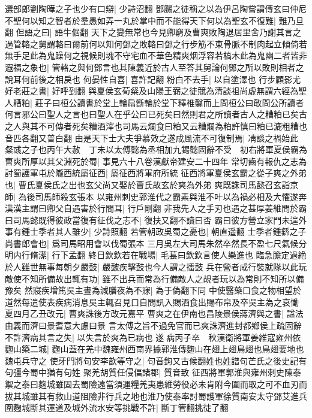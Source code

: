 選部郎劉陶曄之子也少有口辯|{
	少詩沼翻}
鄧颺之徒稱之以為伊呂陶嘗謂傳玄曰仲尼不聖何以知之智者於羣愚如弄一丸於掌中而不能得天下何以為聖玄不復難|{
	難乃旦翻}
但語之曰|{
	語牛倨翻}
天下之變無常也今見卿窮及曹爽敗陶退居里舍乃謝其言之過管輅之舅謂輅曰爾前何以知何鄧之敗輅曰鄧之行步筋不束骨脈不制肉起立傾倚若無手足此為鬼躁何之視候則魂不守宅血不華色精爽烟浮容若槁木此為鬼幽二者皆非遐福之象也|{
	管輅之與何鄧言也其陳義近於古人至答其舅論何鄧之所以敗則相者之說耳何前後之相戾也}
何晏性自喜|{
	喜許記翻}
粉白不去手|{
	以自塗澤也}
行步顧影尤好老莊之書|{
	好呼到翻}
與夏侯玄荀粲及山陽王弼之徒競為清談祖尚虚無謂六經為聖人糟粕|{
	莊子曰桓公讀書於堂上輪扁斵輪於堂下釋椎鑿而上問桓公曰敢問公所讀者何言邪公曰聖人之言也曰聖人在乎公曰已死矣曰然則君之所讀者古人之糟粕已矣古之人與其不可傳者死矣糟酒滓也司馬云爛食曰粕又云糟爛為粕許慎曰粕已漉粗糟也音匹各翻又普白翻}
由是天下士大夫爭慕效之遂成風流不可復制焉|{
	凊談之禍始此}
粲彧之子也丙午大赦　丁未以太傅懿為丞相加九錫懿固辭不受　初右將軍夏侯霸為曹爽所厚以其父淵死於蜀|{
	事見六十八卷漢獻帝建安二十四年}
常切齒有報仇之志為討蜀護軍屯於隴西統屬征西|{
	屬征西將軍府所統}
征西將軍夏侯玄霸之從子爽之外弟也|{
	曹氏夏侯氏之出也玄父尚又娶於曹氏故玄於爽為外弟}
爽既誅司馬懿召玄詣京師|{
	為後司馬師殺玄張本}
以雍州刺史郭淮代之霸素與淮不叶以為禍必相及大懼遂奔漢漢主謂曰卿父自遇害於行間耳|{
	行戶剛翻}
非我先人之手刃也遇之甚厚姜維問於霸曰司馬懿既得彼政當復有征伐之志不|{
	復扶又翻不讀曰否}
霸曰彼方營立家門未遑外事有鍾士季者其人雖少|{
	少詩照翻}
若管朝政吳蜀之憂也|{
	朝直遥翻}
士季者鍾繇之子尚書郎會也|{
	爲司馬昭用會以伐蜀張本}
三月吳左大司馬朱然卒然長不盈七尺氣候分明内行脩潔|{
	行下孟翻}
終日欽欽若在戰場|{
	毛萇曰欽欽言使人樂進也}
臨急膽定過絶於人雖世無事每朝夕嚴鼓|{
	嚴皷疾擊鼓也今人謂之擂鼓}
兵在營者咸行裝就隊以此玩敵使不知所備故出輒有功|{
	雖不出兵而常為行備敵人之覘者玩以為常則不知所以備豫矣}
然寢疾增篤吳主晝為減膳夜為不寐|{
	為于偽翻下同}
中使醫藥口食之物相望於道然每遣使表疾病消息吳主輒召見口自問訊入賜酒食出賜布帛及卒吳主為之哀慟　夏四月乙丑改元|{
	曹爽誅後方改元嘉平}
曹爽之在伊南也昌陵景侯蔣濟與之書|{
	諡法由義而濟曰景耆意大慮曰景}
言太傅之旨不過免官而已爽誅濟進封都鄉侯上疏固辭不許濟病其言之失|{
	以失言於爽為已病也}
遂病丙子卒　秋漢衛將軍姜維寇雍州依麴山築二城|{
	麴山蓋在羌中魏雍州西南界據郭淮傳麴山在翅上翅鳥翅也鳥翅要地也魏屯兵守之}
使牙門將句安李歆等守之|{
	句音鉤又古候翻姓也姓譜句芒氏之後史記有句彊今蜀中猶有句姓}
聚羌胡質任侵偪諸郡|{
	質音致}
征西將軍郭淮與雍州刺史陳泰禦之泰曰麴城雖固去蜀險遠當須運糧羌夷患維勞役必未肯附今圍而取之可不血刃而拔其城雖其有救山道阻險非行兵之地也淮乃使泰率討蜀護軍徐質南安太守鄧艾進兵圍麴城斷其運道及城外流水安等挑戰不許|{
	斷丁管翻挑徒了翻}
